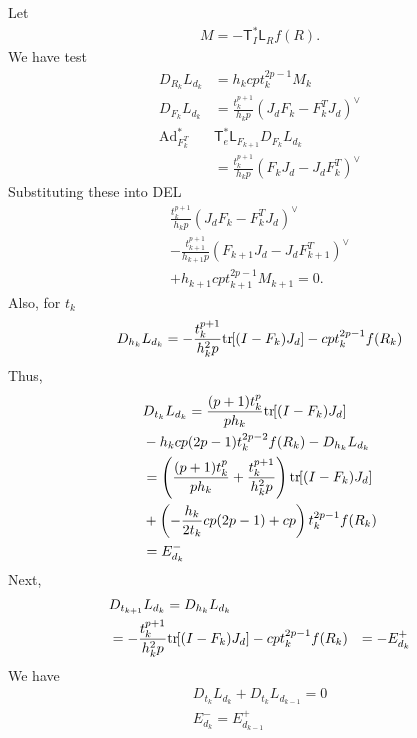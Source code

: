 \documentclass[letterpaper, 10pt, conference]{ieeeconf}
\newcommand{\bracket}[1]{\ensuremath{\left[ #1 \right]}}
\newcommand{\parenth}[1]{\ensuremath{\left( #1 \right)}}
\newcommand{\tr}[1]{\mbox{tr}\ensuremath{\negthickspace\bracket{#1}}}
\newcommand{\T}{\ensuremath{\mathsf{T}}}
\renewcommand{\L}{\ensuremath{\mathsf{L}}}
\newcommand{\Ad}{\ensuremath{\mathrm{Ad}}}
\begin{document}
Let 
\begin{align*}
    M = -\T^*_I \L_R f(R).
\end{align*}
We have test
\begin{align*}
    D_{R_k} L_{d_k} &= h_k cp t_k^{2p-1} M_k \\
    D_{F_k} L_{d_k} &= \frac{t^{p+1}_{k}}{h_k p} (J_dF_k -F_k^T J_d)^\vee \\
    \Ad^*_{F_k^T} & \T^*_e \L_{F_{k+1}} D_{F_k} L_{d_k}\\
                    & = \frac{t^{p+1}_{k}}{h_k p} (F_k J_d - J_dF_k^T)^\vee 
\end{align*}
Substituting these into DEL
\begin{align*}
\frac{t^{p+1}_{k}}{h_k p} (J_dF_k -F_k^T J_d)^\vee \\
- \frac{t^{p+1}_{k+1}}{h_{k+1} p} (F_{k+1} J_d - J_dF_{k+1}^T)^\vee \\
+ h_{k+1} cp t_{k+1}^{2p-1} M_{k+1} = 0.
\end{align*}
Also, for $t_k$
\begin{align*}
    D_{h_k} L_{d_k} =
    -\frac{t^{p+1}_{k}}{h_k^2 p} \tr{(I-F_k)J_d} - c p t_k^{2p-1} f(R_k) 
\end{align*}
Thus,
\begin{align*}
    & D_{t_k} L_{d_k} = 
    \frac{(p+1)t_k^p}{p h_k} \tr{(I-F_k)J_d}  \\
    & -h_k cp(2p-1) t_k^{2p-2} f(R_k)  - D_{h_k} L_{d_k} \\
    & = \parenth{ \frac{(p+1)t_k^p}{p h_k} + \frac{t^{p+1}_{k}}{h_k^2 p} } \tr{(I-F_k)J_d} \\
    & + \parenth{- \frac{h_k}{2 t_k}cp(2p-1) + c p} t_k^{2p-1} f(R_k) \\
    & = E^-_{d_k}\\
\end{align*}
Next,
\begin{align*}
    & D_{t_{k+1}} L_{d_k} = D_{h_k} L_{d_k} \\
    & = -\frac{t^{p+1}_{k}}{h_k^2 p} \tr{(I-F_k)J_d} - c p t_k^{2p-1} f(R_k) 
    & = - E^+_{d_k}
\end{align*}
We have
\begin{gather*}
    D_{t_k} L_{d_k} + D_{t_k} L_{d_{k-1}} = 0\\
    E^-_{d_k} = E^+_{d_{k-1}} \\
\end{gather*}
\end{document}
